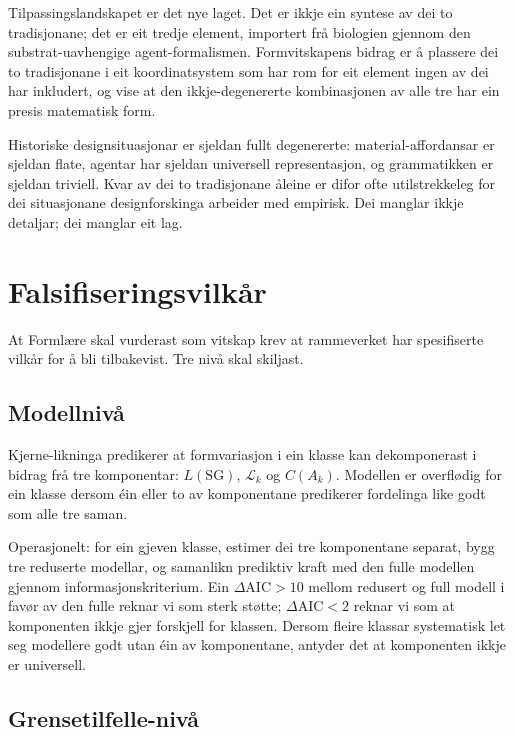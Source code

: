 \documentclass[10pt,a4paper,twocolumn]{article}
\begin{document}
Tilpassingslandskapet er det nye laget. Det er ikkje ein syntese av dei to tradisjonane; det er eit tredje element, importert frå biologien gjennom den substrat-uavhengige agent-formalismen. Formvitskapens bidrag er å plassere dei to tradisjonane i eit koordinatsystem som har rom for eit element ingen av dei har inkludert, og vise at den ikkje-degenererte kombinasjonen av alle tre har ein presis matematisk form.

Historiske designsituasjonar er sjeldan fullt degenererte: material-affordansar er sjeldan flate, agentar har sjeldan universell representasjon, og grammatikken er sjeldan triviell. Kvar av dei to tradisjonane åleine er difor ofte utilstrekkeleg for dei situasjonane designforskinga arbeider med empirisk. Dei manglar ikkje detaljar; dei manglar eit lag.

\section{Falsifiseringsvilkår}

At Formlære skal vurderast som vitskap krev at rammeverket har spesifiserte vilkår for å bli tilbakevist. Tre nivå skal skiljast.

\subsection{Modellnivå}

Kjerne-likninga predikerer at formvariasjon i ein klasse kan dekomponerast i bidrag frå tre komponentar: $L(\mathrm{SG})$, $\mathcal{L}_k$ og $C(A_k)$. Modellen er overflødig for ein klasse dersom éin eller to av komponentane predikerer fordelinga like godt som alle tre saman.

Operasjonelt: for ein gjeven klasse, estimer dei tre komponentane separat, bygg tre reduserte modellar, og samanlikn prediktiv kraft med den fulle modellen gjennom informasjonskriterium. Ein $\Delta\mathrm{AIC} > 10$ mellom redusert og full modell i favør av den fulle reknar vi som sterk støtte; $\Delta\mathrm{AIC} < 2$ reknar vi som at komponenten ikkje gjer forskjell for klassen. Dersom fleire klassar systematisk let seg modellere godt utan éin av komponentane, antyder det at komponenten ikkje er universell.

\subsection{Grensetilfelle-nivå}
\end{document}
